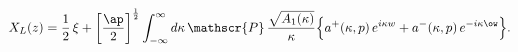\begin{equation}
X_L(z)=\frac{1}{2}\,\xi
+\left[\frac{\ap}{2}\right]^{\frac12}
\int_{-\infty}^{\infty}d\kappa\,\mathscr{P}\,
\frac{\sqrt{A_1(\kappa)}}{\kappa}
\Bigl\{a^+(\kappa,p)\,e^{i\kappa w}+
a^-(\kappa,p)\,e^{-i\kappa \ow}\Bigr\}.
\label{X_Lcont}
\end{equation}

